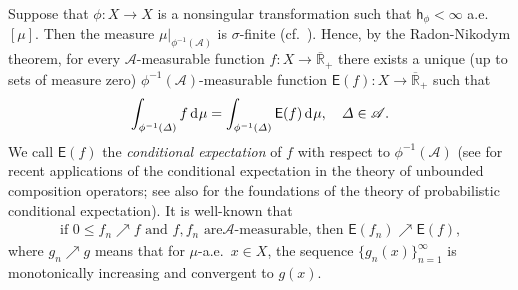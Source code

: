 \documentclass[draft,reqno]{amsproc}
\numberwithin{equation}{section}
\theoremstyle{remark}
\theoremstyle{definition}
\begin{document}
Suppose that $\phi\colon X \to X$ is a nonsingular
transformation such that ${\mathsf h}_\phi < \infty$ a.e.\
$[\mu]$. Then the measure $\mu|_{\phi^{-1}({\mathscr A})}$ is
$\sigma$-finite (cf.\ \cite[Proposition
3.2]{b-j-j-sC}). Hence, by the Radon-Nikodym theorem,
for every ${\mathscr A}$-measurable function $f\colon X \to
{{\overline{\mathbb R}_+}}$ there exists a unique (up to sets of measure
zero) $\phi^{-1}({\mathscr A})$-measurable function
${\mathsf{E}}(f)\colon X \to {{\overline{\mathbb R}_+}}$ such that
   \begin{align} \label{przegad}
\int_{\phi^{-1}(\varDelta)} f \operatorname{d\hspace{-0.25ex}}\mu =
\int_{\phi^{-1}(\varDelta)} {\mathsf{E}}(f) \operatorname{d\hspace{-0.25ex}}\mu, \quad
\varDelta \in {\mathscr A}.
   \end{align}
We call ${\mathsf{E}}(f)$ the {\em conditional expectation} of
$f$ with respect to $\phi^{-1}({\mathscr A})$ (see
\cite{b-j-j-sC} for recent applications of the
conditional expectation in the theory of unbounded
composition operators; see also \cite{Rao} for the
foundations of the theory of probabilistic conditional
expectation). It is well-known that
   \begin{align} \label{CE-2}
\text{if $0{\leqslant} f_n \nearrow f$ and $f,f_n$ are
${\mathscr A}$-measurable, then ${\mathsf{E}}(f_n) \nearrow
{\mathsf{E}}(f)$,}
   \end{align}
where $g_n \nearrow g$ means that for $\mu$-a.e.\
$x\in X$, the sequence $\{g_n(x)\}_{n=1}^\infty$ is
monotonically increasing and convergent to $g(x)$.
\end{document}
